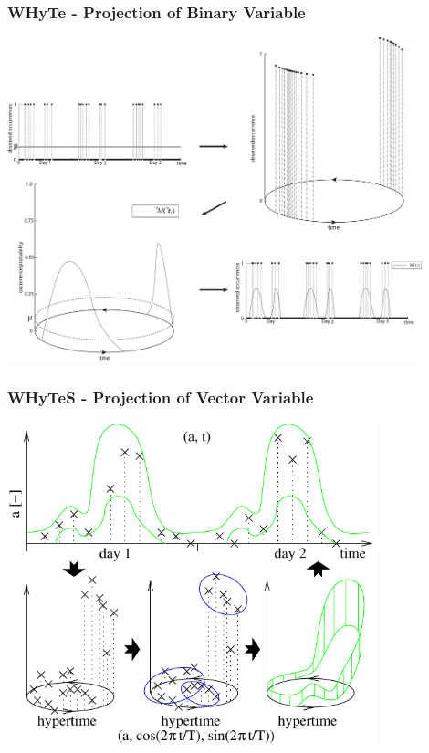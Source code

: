 \begin{frame}
	\frametitle{WHyTe - Projection of Binary Variable}
    \vspace{3mm}
            \includegraphics[width=0.9\textwidth]{fig/hypertime_graphs_a.pdf}
\end{frame}



\begin{frame}
	\frametitle{WHyTeS - Projection of Vector Variable}
    \vspace{3mm}
            \includegraphics[width=0.8\textwidth]{fig/hypertime_space.pdf}
\end{frame}



